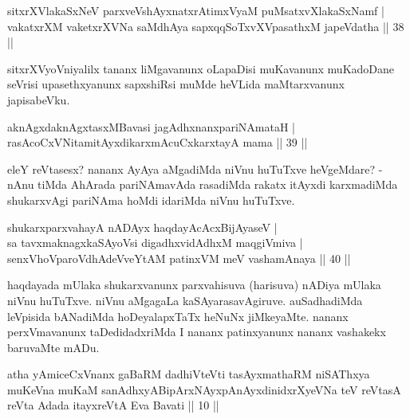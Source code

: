 
\begin{shl}
sitxrXVlakaSxNeV parxveVshAyxnatxrAtimxVyaM puMsatxvXlakaSxNamf | \\
vakatxrXM vaketxrXVNa saMdhAya sapxqqSoTxvXVpasathxM japeVdatha \hfill|| 38 || 
\end{shl}

\begin{artha}
sitxrXVyoVniyalilx tananx liMgavanunx oLapaDisi muKavanunx muKadoDane 
seVrisi upasethxyanunx sapxshiRsi muMde heVLida maMtarxvanunx 
japisabeVku.
\end{artha}


\begin{shl}
aknAgxdaknAgxtasxMBavasi jagAdhxnanxpariNAmataH | \\
rasAcoCxVNitamitAyxdikarxmAcuCxkarxtayA mama \hfill|| 39 || 
\end{shl}

\begin{artha}
eleY reVtasesx? nananx AyAya aMgadiMda niVnu huTuTxve heVgeMdare? - 
nAnu tiMda AhArada pariNAmavAda rasadiMda rakatx itAyxdi 
karxmadiMda shukarxvAgi pariNAma hoMdi idariMda niVnu huTuTxve.
\end{artha}


\begin{shl}
shukarxparxvahayA nADAyx haqdayAcAcxBijAyaseV | \\
sa tavxmaknagxkaSAyoV\s si digadhxvidAdhxM maqgiVmiva | \\
senxVhoVparoVdhAdeVveYtAM patinxVM meV vashamAnaya \hfill|| 40 || 
\end{shl}

\begin{artha}
haqdayada mUlaka shukarxvanunx parxvahisuva (harisuva) nADiya mUlaka 
niVnu huTuTxve. niVnu aMgagaLa kaSAyarasavAgiruve. auSadhadiMda 
leVpisida bANadiMda hoDeyalapxTaTx heNuNx jiMkeyaMte. nananx 
perxVmavanunx taDedidadxriMda I nananx patinxyanunx nananx vashakekx 
baruvaMte mADu.
\end{artha}

\begin{kandikeshl}
atha yAmiceCxVnanx gaBaRM dadhiVteVti tasAyxmathaRM niSAThxya muKeVna muKaM sanAdhxyABipArxNAyxpAnAyxdinidxrXyeVNa teV reVtasA reVta Adada itayxreVtA Eva Bavati || 10 ||
\end{kandikeshl}

